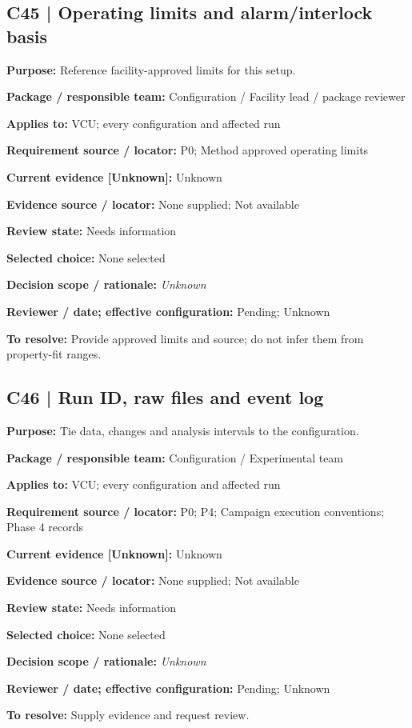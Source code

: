 \documentclass[11pt]{article}
\begin{document}
\begin{minipage}{\textwidth}\small\setlength{\parskip}{2pt}
\subsection*{C45 | Operating limits and alarm/interlock basis}
\textbf{Purpose:} Reference facility-approved limits for this setup.\par
\textbf{Package / responsible team:} Configuration / Facility lead / package reviewer\par
\textbf{Applies to:} VCU; every configuration and affected run\par
\textbf{Requirement source / locator:} P0; Method approved operating limits\par
\textbf{Current evidence [Unknown]:} Unknown\par
\textbf{Evidence source / locator:} None supplied; Not available\par
\textbf{Review state:} Needs information\par
\textbf{Selected choice:} None selected\par
\textbf{Decision scope / rationale:} \textit{Unknown}\par
\textbf{Reviewer / date; effective configuration:} Pending; Unknown\par
\textbf{To resolve:} Provide approved limits and source; do not infer them from property-fit ranges.\par
\end{minipage}\par\vspace{5pt}
\begin{minipage}{\textwidth}\small\setlength{\parskip}{2pt}
\subsection*{C46 | Run ID, raw files and event log}
\textbf{Purpose:} Tie data, changes and analysis intervals to the configuration.\par
\textbf{Package / responsible team:} Configuration / Experimental team\par
\textbf{Applies to:} VCU; every configuration and affected run\par
\textbf{Requirement source / locator:} P0; P4; Campaign execution conventions; Phase 4 records\par
\textbf{Current evidence [Unknown]:} Unknown\par
\textbf{Evidence source / locator:} None supplied; Not available\par
\textbf{Review state:} Needs information\par
\textbf{Selected choice:} None selected\par
\textbf{Decision scope / rationale:} \textit{Unknown}\par
\textbf{Reviewer / date; effective configuration:} Pending; Unknown\par
\textbf{To resolve:} Supply evidence and request review.\par
\end{minipage}\par\vspace{5pt}
\end{document}

